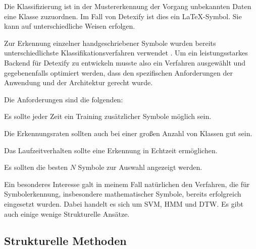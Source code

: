\label{sec:klassifizierung}

Die Klassifizierung ist in der Mustererkennung der Vorgang unbekannten Daten eine Klasse zuzuordnen. Im Fall von Detexify ist dies ein \LaTeX-Symbol. Sie kann auf unterschiedliche Weisen erfolgen.

Zur Erkennung einzelner handgeschriebener Symbole wurden bereits unterschiedlichste Klassifikationsverfahren verwendet \cite{Plamondon:2000p10303}. Um ein leistungsstarkes Backend für Detexify zu entwickeln musste also ein Verfahren ausgewählt und gegebenenfalls optimiert werden, dass den spezifischen Anforderungen der Anwendung und der Architektur gerecht wurde.

Die Anforderungen sind die folgenden:
\begin{description}
  \label{desc:anforderungen} 
  \item[Adaptionsfähigkeit] Es sollte jeder Zeit ein Training zusätzlicher Symbole möglich sein. 
  \item[Skalierbarkeit] Die Erkennungsraten sollten auch bei einer großen Anzahl von Klassen gut sein. 
  \item[Laufzeitverhalten] Das Laufzeitverhalten sollte eine Erkennung in Echtzeit ermöglichen. 
  \item[Interaktivität] Es sollten die besten $N$ Symbole zur Auswahl angezeigt werden. 
\end{description}

Ein besonderes Interesse galt in meinem Fall natürlichen den Verfahren, die für Symbolerkennung, insbesondere mathematischer Symbole, bereits erfolgreich eingesetzt wurden. Dabei handelt es sich um \ac{SVM}, \ac{HMM} und \ac{DTW}. Es gibt auch einige wenige Strukturelle Ansätze.

\subsection{Strukturelle Methoden} \label{sub:strukturelle_methoden}

